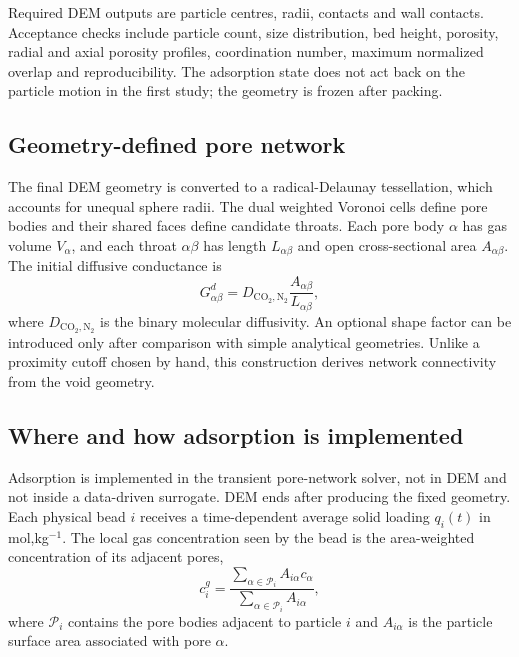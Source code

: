 \documentclass[12pt,a4paper]{article}
\begin{document}
Required DEM outputs are particle centres, radii, contacts and wall contacts.
Acceptance checks include particle count, size distribution, bed height,
porosity, radial and axial porosity profiles, coordination number, maximum
normalized overlap and reproducibility. The adsorption state does not act back
on the particle motion in the first study; the geometry is frozen after packing.

\subsection{Geometry-defined pore network}

The final DEM geometry is converted to a radical-Delaunay tessellation, which
accounts for unequal sphere radii. The dual weighted Voronoi cells define pore
bodies and their shared faces define candidate throats. Each pore body
$\alpha$ has gas volume $V_\alpha$, and each throat $\alpha\beta$ has length
$L_{\alpha\beta}$ and open cross-sectional area $A_{\alpha\beta}$. The initial
diffusive conductance is
\begin{equation}
 G_{\alpha\beta}^{d}
 =D_{\mathrm{CO_2,N_2}}
  \frac{A_{\alpha\beta}}{L_{\alpha\beta}},
 \label{eq:diffconductance}
\end{equation}
where $D_{\mathrm{CO_2,N_2}}$ is the binary molecular diffusivity. An optional
shape factor can be introduced only after comparison with simple analytical
geometries. Unlike a proximity cutoff chosen by hand, this construction derives
network connectivity from the void geometry.

\subsection{Where and how adsorption is implemented}

Adsorption is implemented in the transient pore-network solver, not in DEM and
not inside a data-driven surrogate. DEM ends after producing the fixed geometry. Each physical
bead $i$ receives a time-dependent average solid loading $q_i(t)$ in
mol,kg$^{-1}$. The local gas concentration seen by the bead is the
area-weighted concentration of its adjacent pores,
\begin{equation}
 c_i^{g}=\frac{\sum_{\alpha\in\mathcal P_i}
 A_{i\alpha}c_\alpha}
 {\sum_{\alpha\in\mathcal P_i}A_{i\alpha}},
 \label{eq:localconcentration}
\end{equation}
where $\mathcal P_i$ contains the pore bodies adjacent to particle $i$ and
$A_{i\alpha}$ is the particle surface area associated with pore $\alpha$.
\end{document}
